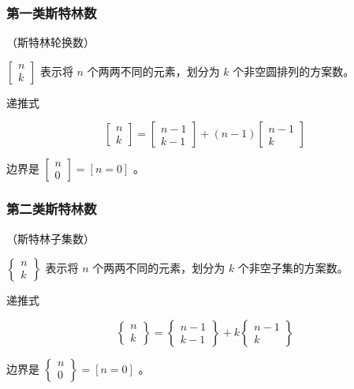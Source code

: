 \subsubsection{第一类斯特林数}

（斯特林轮换数）

$\begin{bmatrix}n\\ k\end{bmatrix}$ 表示将 $n$ 个两两不同的元素，划分为 $k$ 个非空圆排列的方案数。

递推式

$$
\begin{bmatrix}n\\ k\end{bmatrix}=\begin{bmatrix}n-1\\ k-1\end{bmatrix}+(n-1)\begin{bmatrix}n-1\\ k\end{bmatrix}
$$

边界是 $\begin{bmatrix}n\\ 0\end{bmatrix}=[n=0]$ 。

\subsubsection{第二类斯特林数}

（斯特林子集数）

$\begin{Bmatrix}n\\ k\end{Bmatrix}$ 表示将 $n$ 个两两不同的元素，划分为 $k$ 个非空子集的方案数。

递推式

$$
\begin{Bmatrix}n\\ k\end{Bmatrix}=\begin{Bmatrix}n-1\\ k-1\end{Bmatrix}+k\begin{Bmatrix}n-1\\ k\end{Bmatrix}
$$

边界是 $\begin{Bmatrix}n\\ 0\end{Bmatrix}=[n=0]$ 。


